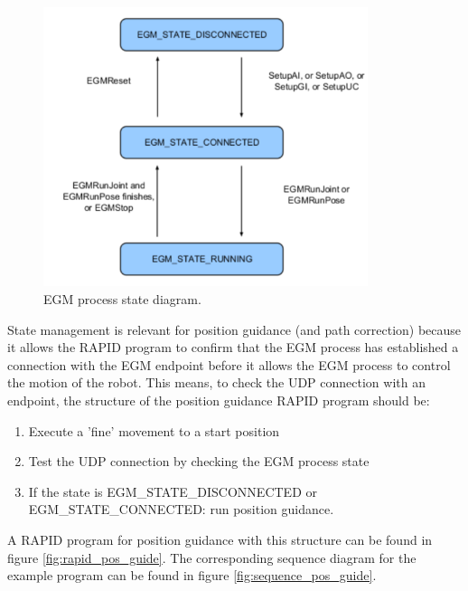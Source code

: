 \documentclass{cslthse-msc}
\begin{document}
\vspace{2cm}
\begin{figure}[H]
    \centering
    \includegraphics[width=9.5cm]{pic_process-state-diagram.png}
    \caption{EGM process state diagram.}
    \label{fig:process_diagram}
\end{figure}
State management is relevant for position guidance (and path correction) because it allows the RAPID program to confirm that the EGM process has established a connection with the EGM endpoint before it allows the EGM process to control the motion of the robot. This means, to check the UDP connection with an endpoint, the structure of the position guidance RAPID program should be:
\begin{enumerate}
    \item Execute a 'fine' movement to a start position
    \item Test the UDP connection by checking the EGM process state
    \item If the state is {\scriptsize{EGM\_STATE\_DISCONNECTED}} or {\scriptsize{EGM\_STATE\_CONNECTED}}: run position guidance.
\end{enumerate}
A RAPID program for position guidance with this structure can be found in figure \ref{fig:rapid_pos_guide}. The corresponding sequence diagram for the example program can be found in figure \ref{fig:sequence_pos_guide}.
\lstset{language=RAPID}
\end{document}
